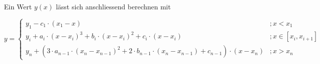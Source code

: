 \documentclass[12pt,titlepage]{article}
\begin{document}
Ein Wert $y(x)$ lässt sich anschliessend berechnen mit
\newline

\begin{equation}
    y = 
    \begin{cases}
        y_1-c_1\cdot (x_1-x) & ;x < x_1\\
        y_i+a_i\cdot (x-x_i)^3+b_i\cdot (x-x_i)^2+c_i\cdot (x-x_i) & ;x\in [x_i,x_{i+1}]\\
        y_n+(3\cdot a_{n-1}\cdot (x_n-x_{n-1})^2+2\cdot b_{n-1}\cdot (x_n-x_{n-1})+c_{n-1})\cdot (x-x_n) & ;x > x_n
    \end{cases}
\end{equation}
\newpage
\end{document}
